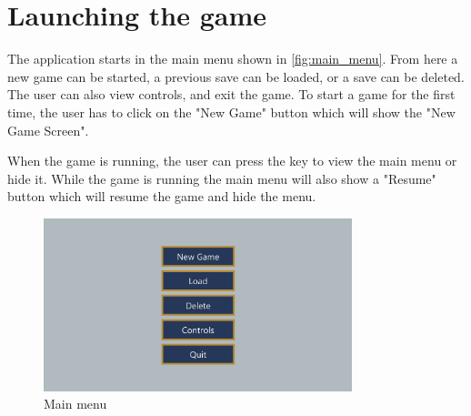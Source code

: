 \section{Launching the game}
The application starts in the main menu shown in \autoref{fig:main_menu}.
From here a new game can be started, a previous save can be loaded, or a save can be deleted.
The user can also view controls, and exit the game.
To start a game for the first time, the user has to click on the "New Game" button which will show the "New Game Screen".

When the game is running, the user can press the \keys{\escwin} key to view the main menu or hide it.
While the game is running the main menu will also show a "Resume" button which will resume the game and hide the menu.

\begin{figure}[!htb]
    \centering
    \includegraphics[width=0.8\textwidth]{chapters/user_manual/resources/main-menu.png}
    \caption{Main menu}
    \label{fig:main_menu}
\end{figure}